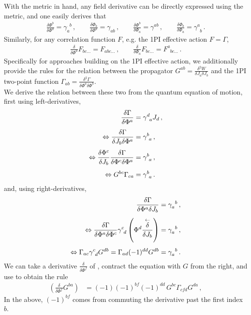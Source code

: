 \documentclass[preprint,10pt,sort&compress]{elsarticle}
\begin{document}
With the metric in hand, any field derivative can be directly expressed using the metric, and one easily derives that
%
\begin{align}
	\frac{\delta \Phi^b}{\delta \Phi^a} = \gamma_a^{\phantom{a}b}
	\,,\qquad
	\frac{\delta \Phi_b}{\delta \Phi^a} = \gamma_{ab}
	\,,\qquad
	\frac{\delta \Phi^b}{\delta \Phi_a} = \gamma^{ab}
	\,,\qquad
	\frac{\delta \Phi_b}{\delta \Phi_a} = \gamma^{a}_{\phantom{a}b}
	\,.
\end{align}
%
Similarly, for any correlation function $F$, e.g. the 1PI effective action $F=\Gamma$,
%
\begin{align}
	\frac{\delta }{\delta \Phi^a} F_{bc\ldots} = F_{abc\ldots}
	\,,\qquad
	\frac{\delta }{\delta \Phi_a} F_{bc\ldots} = F^{a}_{\phantom{a}bc\ldots}
	\,.
\end{align}
%
Specifically for approaches building on the 1PI effective action, we additionally provide the rules for the relation between the propagator $G^{ab} = \frac{\delta^2 W}{\delta J_a \delta J_b}$ and the 1PI two-point function $\Gamma_{ab} = \frac{\delta^2 \Gamma}{\delta \Phi^a \delta \Phi^b}$. \\[0.5ex]
We derive the relation between these two from the quantum equation of motion, first using left-derivatives,
%
\begin{align}\label{eq:propInvLeft}
	\frac{\delta \Gamma}{\delta \Phi^a} &= \gamma^d_{\phantom{d}a}J_d
	\,,\notag\\[1ex]\Leftrightarrow
	\frac{\delta \Gamma}{\delta J_b\delta \Phi^a} &= \gamma^b_{\phantom{b}a}
	\,,\notag\\[1ex]\Leftrightarrow
	\frac{\delta \Phi^c}{\delta J_b}\frac{\delta \Gamma}{\delta \Phi^c\delta \Phi^a} &= \gamma^b_{\phantom{b}a}
	\,,\notag\\[1ex]\Leftrightarrow
	G^{bc}\Gamma_{ca} &= \gamma^b_{\phantom{b}a}
	\,.
\end{align}
%
and, using right-derivatives,
%
\begin{align}\label{eq:propInvRight}
	\frac{\delta \Gamma}{\delta \Phi^a\delta J_b} &= \gamma_a^{\phantom{a}b}
	\,,\notag\\[1ex]\Leftrightarrow
	\frac{\delta \Gamma}{\delta \Phi^a\delta \Phi^c}\gamma^c_{\phantom{c}d}\left(\Phi^d\frac{\overset{\leftarrow}{\delta}}{\delta J_b}\right) &= \gamma_a^{\phantom{a}b}
	\,,\notag\\[1ex]\Leftrightarrow
	\Gamma_{ac}\gamma^c_{\phantom{c}d}G^{db} = \Gamma_{ad}(-1)^{dd}G^{db} &= \gamma_a^{\phantom{a}b}
	\,.
\end{align}
%
We can take a derivative $\frac{\delta}{\delta\Phi^f}$ of , contract the equation with $G$ from the right, and use  to obtain the rule
%
\begin{align}\label{eq:derivG_full}
	\left(\frac{\delta}{\delta \Phi^f}G^{ba}\right)
	&= (-1)(-1)^{bf}(-1)^{dd}\, G^{bc}\Gamma_{cfd}G^{da}\,,
\end{align}
%
In the above, $(-1)^{bf}$ comes from commuting the derivative past the first index $b$.
\end{document}
